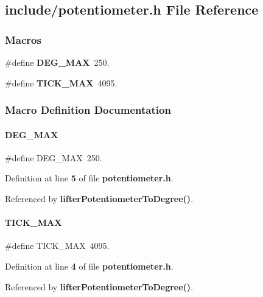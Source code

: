 \subsection{include/potentiometer.h File Reference}
\label{a00056}
\subsubsection*{Macros}
\begin{DoxyCompactItemize}
\item 
\#define \textbf{ D\+E\+G\+\_\+\+M\+AX}~250.
\item 
\#define \textbf{ T\+I\+C\+K\+\_\+\+M\+AX}~4095.
\end{DoxyCompactItemize}


\subsubsection{Macro Definition Documentation}
\mbox{\label{a00056_ab77b81696cf83be632fca5f56b4c3595}} 
\paragraph{D\+E\+G\+\_\+\+M\+AX}
{\footnotesize\ttfamily \#define D\+E\+G\+\_\+\+M\+AX~250.}



Definition at line \textbf{ 5} of file \textbf{ potentiometer.\+h}.



Referenced by \textbf{ lifter\+Potentiometer\+To\+Degree()}.

\mbox{\label{a00056_ad40f2bbc4e57baed2d9e900750d94a7f}} 
\paragraph{T\+I\+C\+K\+\_\+\+M\+AX}
{\footnotesize\ttfamily \#define T\+I\+C\+K\+\_\+\+M\+AX~4095.}



Definition at line \textbf{ 4} of file \textbf{ potentiometer.\+h}.



Referenced by \textbf{ lifter\+Potentiometer\+To\+Degree()}.

